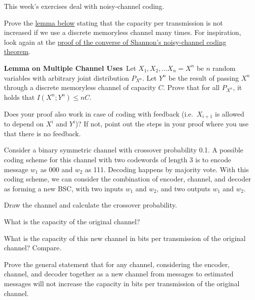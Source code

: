 \documentclass[a4paper,10pt,landscape,twocolumn]{scrartcl}
\begin{document}
\practiceproblems

{\sffamily\noindent
This week's exercises deal with noisy-channel coding. \practiceinstructions
}


\begin{exercise}
Prove the \href{https://canvas.uva.nl/courses/17524/pages/definition-channel-capacity#lemma}{lemma below} stating that the capacity per transmission is not increased if we use a discrete memoryless channel many times. For inspiration, look again at the \href{https://canvas.uva.nl/courses/17524/pages/noisy-channel-theorem-converse}{proof of the converse of Shannon's noisy-channel coding theorem}.

\medskip
\noindent\textbf{Lemma on Multiple Channel Uses}\  Let $X_1, X_2, \ldots X_n = X^n$ be $n$ random variables with arbitrary joint distribution $P_{X^n}$. Let $Y^n$ be the result of passing $X^n$ through a discrete memoryless channel of capacity $C$. Prove that for all $P_{X^n}$, it holds that $I(X^n; Y^n) \leq nC$.
\medskip

Does your proof also work in case of coding with feedback (i.e.\ $X_{i+1}$ is allowed to depend on $X^i$ and $Y^i$)? If not, point out the steps in your proof where you use that there is no feedback.
\end{exercise}




\begin{exercise}
Consider a binary symmetric channel with crossover probability 0.1. A possible coding scheme for this channel with two codewords of length 3 is to encode message $w_1$ as 000 and $w_2$ as 111. Decoding happens by majority vote. With this coding scheme, we can consider the combination of encoder, channel, and decoder as forming a new BSC, with two inputs $w_1$ and $w_2$, and two outputs $w_1$ and $w_2$.

\begin{subex}
Draw the channel and calculate the crossover probability.
\end{subex}

\begin{subex}
What is the capacity of the original channel?
\end{subex}

\begin{subex}
What is the capacity of this new channel in bits per transmission of the original channel? Compare.
\end{subex}

\begin{subex}
Prove the general statement that for any channel, considering the encoder, channel, and decoder together as a new channel from messages to estimated messages will not increase the capacity in bits per transmission of the original channel.
\end{subex}

\end{exercise}
\end{document}
